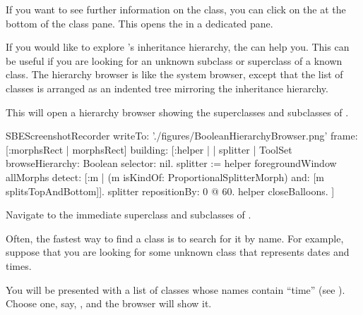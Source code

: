 \documentclass[a4paper,10pt,twoside]{book}
\begin{document}
If you want to see further information on the class, you can click on the  at the bottom of the class pane.
This opens the  in a dedicated pane.

If you would like to explore \sq's inheritance hierarchy, the  can help you.
This can be useful if you are looking for an unknown subclass or superclass of a known class.
The hierarchy browser is like the system browser, except that the list of classes is arranged as an indented tree mirroring the inheritance hierarchy.

\noindent
This will open a hierarchy browser showing the superclasses and subclasses of .

\begin{ExecuteSmalltalkScript}
SBEScreenshotRecorder writeTo: './figures/BooleanHierarchyBrowser.png' frame: [:morphsRect | morphsRect] building: [:helper |
	| splitter |
	ToolSet browseHierarchy: Boolean selector: nil.
	splitter := helper foregroundWindow allMorphs detect: [:m |
		(m isKindOf: ProportionalSplitterMorph) and: [m splitsTopAndBottom]].
	splitter repositionBy: 0 @ 60.
	helper closeBalloons.
]
\end{ExecuteSmalltalkScript}

Navigate to the immediate superclass and subclasses of .

Often, the fastest way to find a class is to search for it by name.
For example, suppose that you are looking for some unknown class that represents dates and times.

\noindent
You will be presented with a list of classes whose names contain ``time'' (see ).
Choose one, say, , and the browser will show it.
\end{document}
